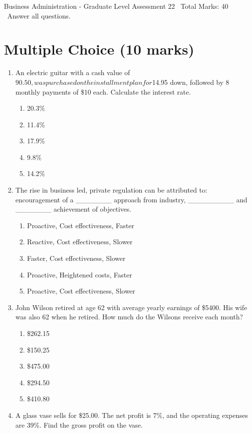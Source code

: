 \documentclass[12pt]{article}
\begin{document}
\begin{center}
Business Administration - Graduate Level Assessment 22 \
Total Marks: 40 \
Answer all questions.
\end{center}

\section*{Multiple Choice (10 marks)}
\begin{enumerate}[label=\arabic*.]
\item An electric guitar with a cash value of $90.50, was purchased on the installment plan for $14.95 down, followed by 8 monthly payments of \$10 each. Calculate the interest rate.
\begin{enumerate}[label=(\alph*)]
    \item 20.3\%
    \item 11.4\%
    \item 17.9\%
    \item 9.8\%
    \item 14.2\%
\end{enumerate}
\item The rise in business led, private regulation can be attributed to: encouragement of a \_\_\_\_\_\_\_ approach from industry, \_\_\_\_\_\_\_\_\_ and \_\_\_\_\_\_\_ achievement of objectives.
\begin{enumerate}[label=(\alph*)]
    \item Proactive, Cost effectiveness, Faster
    \item Reactive, Cost effectiveness, Slower
    \item Faster, Cost effectiveness, Slower
    \item Proactive, Heightened costs, Faster
    \item Proactive, Cost effectiveness, Slower
\end{enumerate}
\item John Wilson retired at age 62 with average yearly earnings of \$5400. His wife was also 62 when he retired. How much do the Wilsons receive each month?
\begin{enumerate}[label=(\alph*)]
    \item \$262.15
    \item \$150.25
    \item \$475.00
    \item \$294.50
    \item \$410.80
\end{enumerate}
\item A glass vase sells for \$25.00. The net profit is 7\%, and the operating expenses are 39\%. Find the gross profit on the vase.

\end{enumerate}
\end{document}
